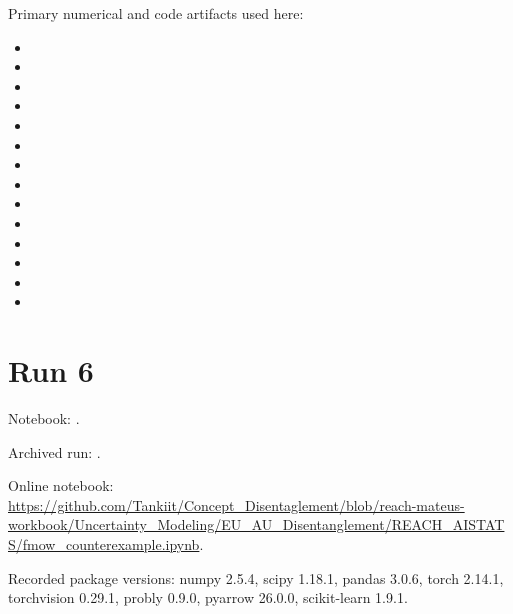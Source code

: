 Primary numerical and code artifacts used here:

\begin{itemize}

\item {}

\item {}

\item {}

\item {}

\item {}

\item {}

\item {}

\item {}

\item {}

\item {}

\item {}

\item {}

\item {}

\item {}

\end{itemize}

\section{Run 6}

Notebook: .

Archived run: .

Online notebook: \url{https://github.com/Tankiit/Concept_Disentaglement/blob/reach-mateus-workbook/Uncertainty_Modeling/EU_AU_Disentanglement/REACH_AISTATS/fmow_counterexample.ipynb}.

Recorded package versions: numpy 2.5.4, scipy 1.18.1, pandas 3.0.6, torch 2.14.1, torchvision 0.29.1, probly 0.9.0, pyarrow 26.0.0, scikit-learn 1.9.1.

